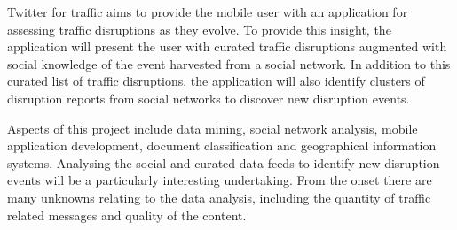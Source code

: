Twitter for traffic aims to provide the mobile user with an application for
assessing traffic disruptions as they evolve. To provide this insight, the
application will present the user with curated traffic disruptions augmented
with social knowledge of the event harvested from a social network. In addition
to this curated list of traffic disruptions, the application will also identify
clusters of disruption reports from social networks to discover new disruption events.

Aspects of this project include data mining, social network analysis, mobile
application development, document classification and geographical information
systems. Analysing the social and curated data feeds to identify new disruption
events will be a particularly interesting undertaking. From the onset there are
many unknowns relating to the data analysis, including the quantity of traffic related messages and quality of the content. 
